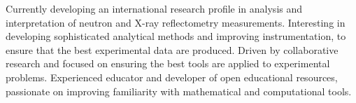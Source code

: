 \vspace{0.25cm}

\begin{cvparagraph}

Currently developing an international research profile in analysis and interpretation of neutron and X-ray reflectometry measurements. 
Interesting in developing sophisticated analytical methods and improving instrumentation, to ensure that the best experimental data are produced.
Driven by collaborative research and focused on ensuring the best tools are applied to experimental problems. 
Experienced educator and developer of open educational resources, passionate on improving familiarity with mathematical and computational tools.
\end{cvparagraph}